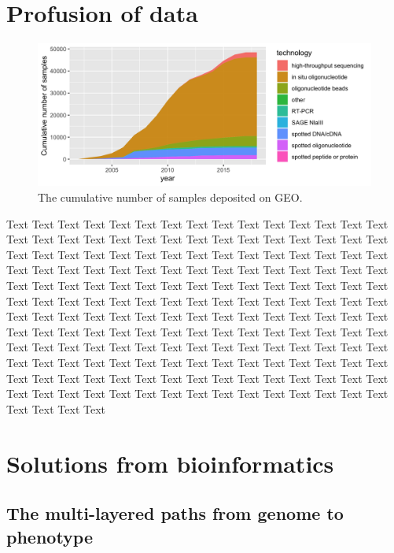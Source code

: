 \documentclass{bioinfo}
\begin{document}
\section{Profusion of data}

\begin{figure}[!tpb]%
\includegraphics[width=1\linewidth]{gsm_count_by_tech.png}
	\caption{The cumulative number of samples deposited on GEO.}\label{fig:01}
\end{figure}

Text Text Text Text Text Text  Text Text Text Text Text Text Text Text  Text Text Text Text Text Text Text Text  Text Text Text Text Text Text Text Text  Text Text Text Text Text Text Text Text  Text Text Text Text Text Text Text Text  Text Text Text Text Text Text Text Text  Text Text Text Text Text Text Text Text  Text Text Text Text Text Text Text Text  Text Text Text Text Text Text Text Text  Text Text Text Text Text Text Text Text  Text Text Text Text Text Text Text Text  Text Text Text Text Text Text Text Text  Text Text Text Text Text Text Text Text  Text Text Text Text Text Text Text Text  Text Text Text Text Text Text Text Text  Text Text Text Text Text Text Text Text  Text Text Text Text Text Text Text Text  Text Text Text Text Text Text Text Text  Text Text Text Text Text Text Text Text  Text Text Text Text Text Text Text Text  Text Text Text Text Text Text Text Text  Text Text Text Text Text Text Text Text  Text Text 
%
\section{Solutions from bioinformatics}
\subsection{The multi-layered paths from genome to phenotype}
\end{document}
